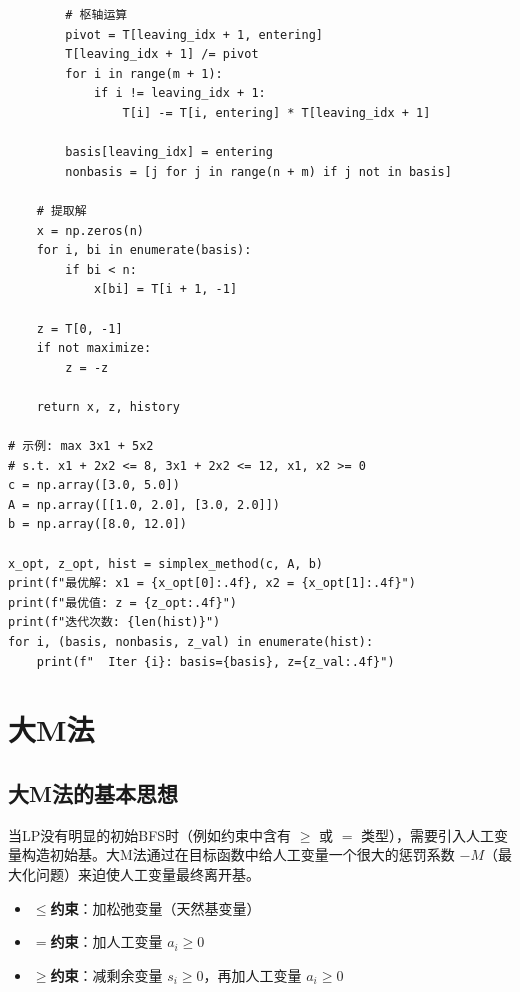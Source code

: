 \begin{codebox}[单纯形法完整实现]
\begin{lstlisting}
        # 枢轴运算
        pivot = T[leaving_idx + 1, entering]
        T[leaving_idx + 1] /= pivot
        for i in range(m + 1):
            if i != leaving_idx + 1:
                T[i] -= T[i, entering] * T[leaving_idx + 1]
        
        basis[leaving_idx] = entering
        nonbasis = [j for j in range(n + m) if j not in basis]
    
    # 提取解
    x = np.zeros(n)
    for i, bi in enumerate(basis):
        if bi < n:
            x[bi] = T[i + 1, -1]
    
    z = T[0, -1]
    if not maximize:
        z = -z
    
    return x, z, history

# 示例: max 3x1 + 5x2
# s.t. x1 + 2x2 <= 8, 3x1 + 2x2 <= 12, x1, x2 >= 0
c = np.array([3.0, 5.0])
A = np.array([[1.0, 2.0], [3.0, 2.0]])
b = np.array([8.0, 12.0])

x_opt, z_opt, hist = simplex_method(c, A, b)
print(f"最优解: x1 = {x_opt[0]:.4f}, x2 = {x_opt[1]:.4f}")
print(f"最优值: z = {z_opt:.4f}")
print(f"迭代次数: {len(hist)}")
for i, (basis, nonbasis, z_val) in enumerate(hist):
    print(f"  Iter {i}: basis={basis}, z={z_val:.4f}")
\end{lstlisting}
\end{codebox}

\section{大M法}\label{sec:bigM}

\subsection{大M法的基本思想}

当LP没有明显的初始BFS时（例如约束中含有 $\geq$ 或 $=$ 类型），需要引入人工变量构造初始基。大M法通过在目标函数中给人工变量一个很大的惩罚系数 $-M$（最大化问题）来迫使人工变量最终离开基。

\begin{conceptbox}[人工变量的引入]
\begin{itemize}
    \item \textbf{$\leq$约束}：加松弛变量（天然基变量）
    \item \textbf{$=$约束}：加人工变量 $a_i \geq 0$
    \item \textbf{$\geq$约束}：减剩余变量 $s_i \geq 0$，再加人工变量 $a_i \geq 0$
\end{itemize}
\end{conceptbox}

